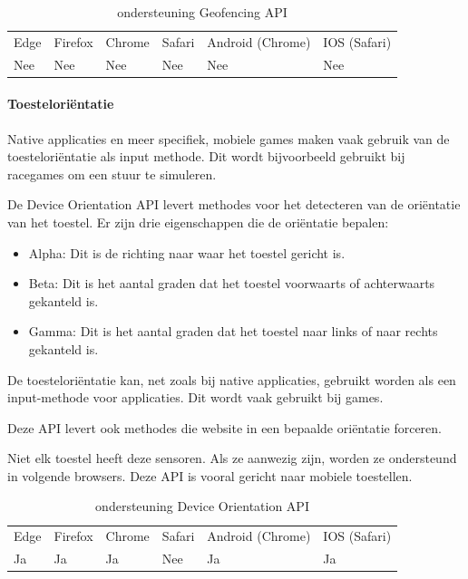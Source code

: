 \begin{table}[H]
	\centering
	\begin{tabular}{llllll}
		Edge & Firefox & Chrome & Safari & Android (Chrome) & IOS (Safari) \\
		Nee   & Nee      &  Nee     & Nee     & Nee               & Nee          
	\end{tabular}	
	\caption{ondersteuning Geofencing API}
	\label{ondersteuning Geofencing API}
\end{table}

\paragraph{Toesteloriëntatie }

Native applicaties en meer specifiek, mobiele games maken vaak gebruik van de toesteloriëntatie als input methode. Dit wordt bijvoorbeeld gebruikt bij racegames om een stuur te simuleren.

De Device Orientation API \autocite{Tibbett2020a} levert methodes voor het detecteren van de oriëntatie van het toestel. Er zijn drie eigenschappen die de oriëntatie bepalen:


 \begin{itemize}
	\item	Alpha:  Dit is de richting naar waar het toestel gericht is.
	\item	Beta:  Dit is het aantal graden dat het toestel voorwaarts of achterwaarts gekanteld is.
	\item   Gamma: Dit is het aantal graden dat het toestel naar links of naar rechts gekanteld is.
\end{itemize}


De toesteloriëntatie kan, net zoals bij native applicaties, gebruikt worden als een input-methode voor applicaties. Dit wordt vaak gebruikt bij games.

Deze API levert ook methodes die website in een bepaalde oriëntatie forceren.

Niet elk toestel heeft deze sensoren. Als ze aanwezig zijn, worden ze ondersteund in volgende browsers. Deze API is vooral gericht naar mobiele toestellen. 

\begin{table}[H]
	\centering
	\begin{tabular}{llllll}
		Edge & Firefox & Chrome & Safari & Android (Chrome) & IOS (Safari) \\
		Ja   & Ja      &  Ja   & Nee     & Ja               & Ja          
	\end{tabular}	
	\caption{ondersteuning Device Orientation API }
	\label{ondersteuning Device Orientation API }
\end{table}

